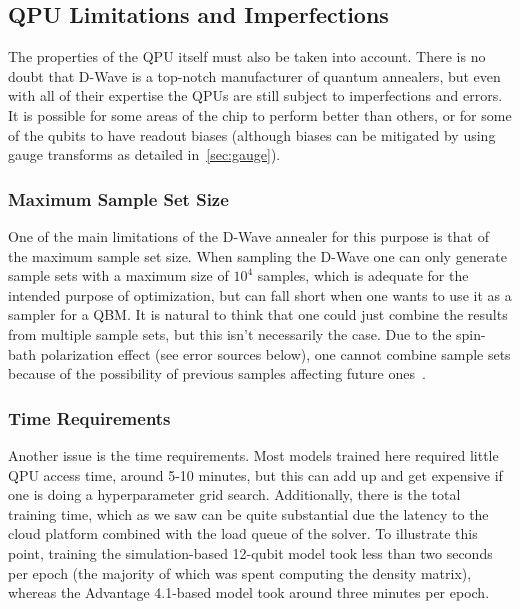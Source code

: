 \subsection{QPU Limitations and Imperfections}
The properties of the QPU itself must also be taken into account.
There is no doubt that D-Wave is a top-notch manufacturer of quantum annealers, but even with all of their expertise the QPUs are still subject to imperfections and errors.
It is possible for some areas of the chip to perform better than others, or for some of the qubits to have readout biases (although biases can be mitigated by using gauge transforms as detailed in~\cref{sec:gauge}).

\subsubsection{Maximum Sample Set Size}
One of the main limitations of the D-Wave annealer for this purpose is that of the maximum sample set size.
When sampling the D-Wave one can only generate sample sets with a maximum size of \( 10^4 \) samples, which is adequate for the intended purpose of optimization, but can fall short when one wants to use it as a sampler for a QBM.
It is natural to think that one could just combine the results from multiple sample sets, but this isn't necessarily the case.
Due to the spin-bath polarization effect (see error sources below), one cannot combine sample sets because of the possibility of previous samples affecting future ones~\cite{pochart_2021}.

\subsubsection{Time Requirements}
Another issue is the time requirements.
Most models trained here required little QPU access time, around 5-10 minutes, but this can add up and get expensive if one is doing a hyperparameter grid search.
Additionally, there is the total training time, which as we saw can be quite substantial due the latency to the cloud platform combined with the load queue of the solver.
To illustrate this point, training the simulation-based 12-qubit model took less than two seconds per epoch (the majority of which was spent computing the density matrix), whereas the Advantage 4.1-based model took around three minutes per epoch.

